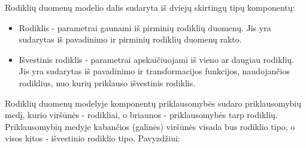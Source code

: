 \documentclass{VUMIFPSbakalaurinis}
\begin{document}
Rodiklių duomenų modelio dalis sudaryta iš dviejų skirtingų tipų komponentų:
\begin{itemize}
    \item Rodiklis - parametrai gaunami iš pirminių rodiklių duomenų. Jis yra sudarytas iš pavadinimo ir pirminių rodiklių duomenų rakto.
    \item Išvestinis rodiklis - parametrai apskaičiuojami iš vieno ar daugiau rodiklių. Jis yra sudarytas iš pavadinimo ir transformacijos funkcijos, naudojančios rodiklius, nuo kurių priklauso išvestinis rodiklis. 
\end{itemize}
Rodiklių duomenų modelyje komponentų priklausomybės sudaro priklausomybių medį, kurio viršūnės - rodikliai, o briaunos - priklausomybės tarp rodiklių. Priklausomybių medyje kabančios (galinės) viršūnės visada bus rodiklio tipo, o visos kitos - išvestinio rodiklio tipo.
Pavyzdžiui:
\end{document}
